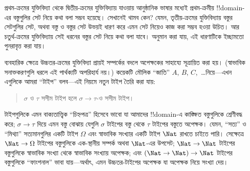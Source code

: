 \documentclass[../../../include/open-logic-section]{subfiles}
\begin{document}


প্রথম-ক্রমের যুক্তিবিদ্যা থেকে দ্বিতীয়-ক্রমের যুক্তিবিদ্যায় যাওয়ায়
আনুষ্ঠানিক ভাষার মধ্যেই প্রথম-ক্রমীয় !!{domain}-এর বস্তুগুলির সেট নিয়ে
কথা বলা সম্ভব হয়েছে। সেখানেই থামব কেন? যেমন, তৃতীয়-ক্রমের
যুক্তিবিদ্যায় বস্তুর সেটগুলির সেট, অথবা বস্তু ও বস্তুর সেট উভয়ই ধারণ
করে এমন সেট নিয়েও কাজ করা সম্ভব হওয়া উচিত। আর চতুর্থ-ক্রমের
যুক্তিবিদ্যায় সেই ধরনের বস্তুর সেট নিয়ে কথা বলা যাবে। অনুমান করা যায়,
এই ধারণাটিকে ইচ্ছামতো পুনরাবৃত্ত করা যায়।

ব্যবহারিক ক্ষেত্রে উচ্চতর-ক্রমের যুক্তিবিদ্যা প্রায়ই সম্পর্কের বদলে
অপেক্ষকের সাহায্যে সূত্রায়িত করা হয়। (স্বাভাবিক সনাক্তকরণগুলি
ধরলে এই পার্থক্যটি অপরিহার্য নয়।) কয়েকটি মৌলিক “জাতি” $A$, $B$,
$C$,~\dots নিয়ে---এখন এগুলিকে আমরা “টাইপ” বলব---এই নিয়মে নতুন টাইপ
তৈরি করা যায়:
\begin{quote}
$\sigma$ ও $\tau$ সসীম টাইপ হলে $\sigma \to \tau$-ও সসীম টাইপ।
\end{quote}
টাইপগুলিকে এমন বাক্যতাত্ত্বিক “চিহ্নপত্র” হিসেবে ভাবো যা আমাদের
!!{domain}-এ কাঙ্ক্ষিত বস্তুগুলিকে শ্রেণীবদ্ধ করে; $\sigma \to \tau$
দিয়ে এমন বস্তু বোঝায় যেগুলি $\sigma$ টাইপের বস্তু থেকে $\tau$ টাইপের
বস্তুতে অপেক্ষক। যেমন, “সত্য” ও “মিথ্যা” সত্যমানগুলির একটি টাইপ
$\Omega$ এবং স্বাভাবিক সংখ্যার একটি টাইপ $\Nat$ রাখতে চাইতে পারি।
সেক্ষেত্রে $\Nat \to \Omega$ টাইপের বস্তুগুলিকে এক-স্থানীয় সম্পর্ক
অথবা $\Nat$-এর উপসেট; $\Nat \to \Nat$ টাইপের বস্তুগুলিকে স্বাভাবিক
সংখ্যা থেকে স্বাভাবিক সংখ্যায় অপেক্ষক; এবং $(\Nat \to \Nat) \to
\Nat$ টাইপের বস্তুগুলিকে “ফাংশনাল” ভাবা যায়---অর্থাৎ, এমন
উচ্চতর-টাইপের অপেক্ষক যা অপেক্ষক নিয়ে সংখ্যা দেয়।
\end{document}
